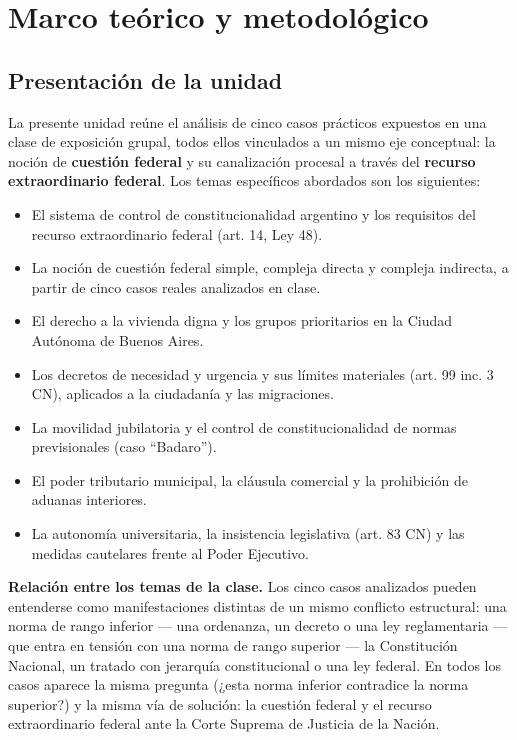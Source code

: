 \documentclass[12pt,oneside]{book}
\begin{document}
\tableofcontents


\chapter{Marco teórico y metodológico}

\section{Presentación de la unidad}

La presente unidad reúne el análisis de cinco casos prácticos expuestos en una clase de exposición grupal, todos ellos vinculados a un mismo eje conceptual: la noción de \textbf{cuestión federal} y su canalización procesal a través del \textbf{recurso extraordinario federal}. Los temas específicos abordados son los siguientes:

\begin{itemize}
    \item El sistema de control de constitucionalidad argentino y los requisitos del recurso extraordinario federal (art. 14, Ley 48).
    \item La noción de cuestión federal simple, compleja directa y compleja indirecta, a partir de cinco casos reales analizados en clase.
    \item El derecho a la vivienda digna y los grupos prioritarios en la Ciudad Autónoma de Buenos Aires.
    \item Los decretos de necesidad y urgencia y sus límites materiales (art. 99 inc. 3 CN), aplicados a la ciudadanía y las migraciones.
    \item La movilidad jubilatoria y el control de constitucionalidad de normas previsionales (caso ``Badaro'').
    \item El poder tributario municipal, la cláusula comercial y la prohibición de aduanas interiores.
    \item La autonomía universitaria, la insistencia legislativa (art. 83 CN) y las medidas cautelares frente al Poder Ejecutivo.
\end{itemize}

\begin{note}
\textbf{Relación entre los temas de la clase.} Los cinco casos analizados pueden entenderse como manifestaciones distintas de un mismo conflicto estructural: una norma de rango inferior --- una ordenanza, un decreto o una ley reglamentaria --- que entra en tensión con una norma de rango superior --- la Constitución Nacional, un tratado con jerarquía constitucional o una ley federal. En todos los casos aparece la misma pregunta (¿esta norma inferior contradice la norma superior?) y la misma vía de solución: la cuestión federal y el recurso extraordinario federal ante la Corte Suprema de Justicia de la Nación.
\end{note}
\end{document}

